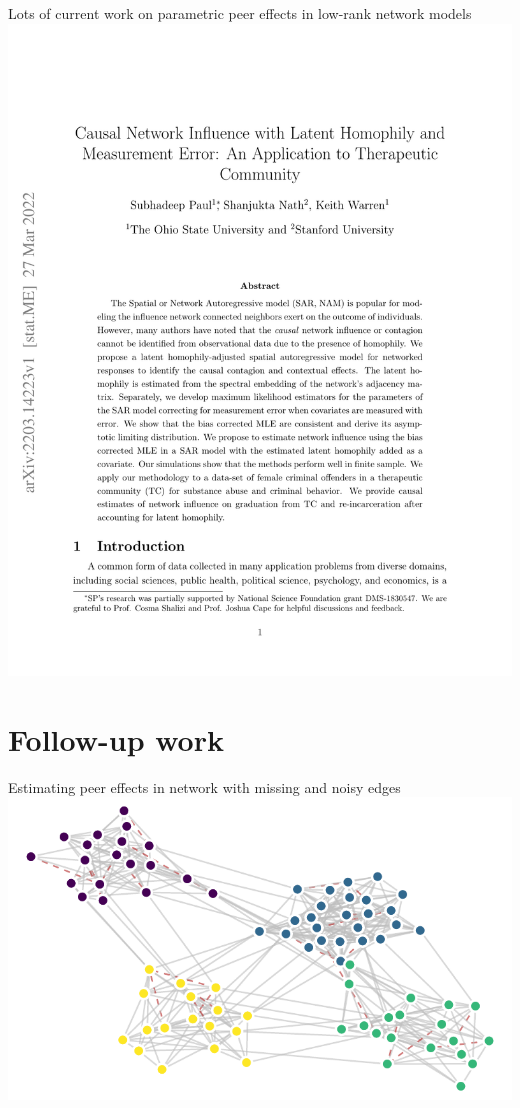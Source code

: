 \documentclass[aspectratio=169]{beamer}
\theoremstyle{remark}
\begin{document}
\begin{frame}{Lots of current work on parametric peer effects in low-rank network models}
    \centering
    \includegraphics[height=0.95\textheight, page=1, trim={1.5cm 6cm 0 4cm}, clip]{./papers/paul.pdf}
\end{frame}



\section{Follow-up work}

\begin{frame}{Estimating peer effects in network with missing and noisy edges}
    \centering
    \includegraphics{./figures/missing-edges.pdf}
\end{frame}
\end{document}

